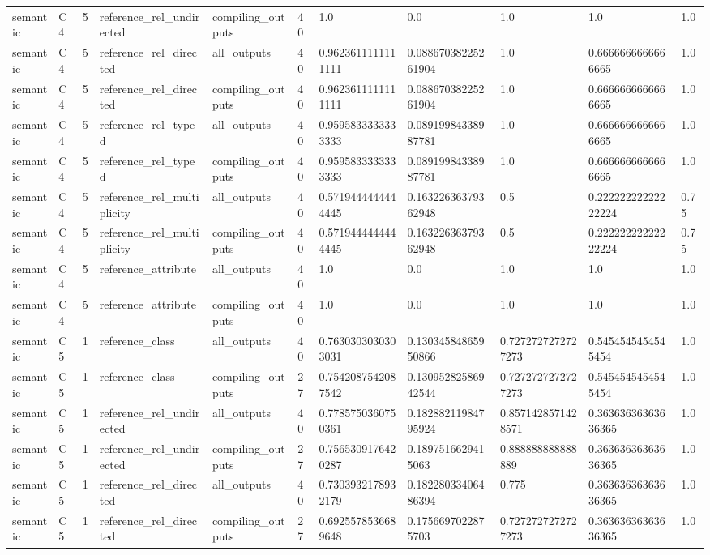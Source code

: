 \begin{tabular}{lllllllllll}
semantic & C4 & 5 & reference\_rel\_undirected & compiling\_outputs & 40 & 1.0 & 0.0 & 1.0 & 1.0 & 1.0 \\
semantic & C4 & 5 & reference\_rel\_directed & all\_outputs & 40 & 0.9623611111111111 & 0.08867038225261904 & 1.0 & 0.6666666666666665 & 1.0 \\
semantic & C4 & 5 & reference\_rel\_directed & compiling\_outputs & 40 & 0.9623611111111111 & 0.08867038225261904 & 1.0 & 0.6666666666666665 & 1.0 \\
semantic & C4 & 5 & reference\_rel\_typed & all\_outputs & 40 & 0.9595833333333333 & 0.08919984338987781 & 1.0 & 0.6666666666666665 & 1.0 \\
semantic & C4 & 5 & reference\_rel\_typed & compiling\_outputs & 40 & 0.9595833333333333 & 0.08919984338987781 & 1.0 & 0.6666666666666665 & 1.0 \\
semantic & C4 & 5 & reference\_rel\_multiplicity & all\_outputs & 40 & 0.5719444444444445 & 0.16322636379362948 & 0.5 & 0.22222222222222224 & 0.75 \\
semantic & C4 & 5 & reference\_rel\_multiplicity & compiling\_outputs & 40 & 0.5719444444444445 & 0.16322636379362948 & 0.5 & 0.22222222222222224 & 0.75 \\
semantic & C4 & 5 & reference\_attribute & all\_outputs & 40 & 1.0 & 0.0 & 1.0 & 1.0 & 1.0 \\
semantic & C4 & 5 & reference\_attribute & compiling\_outputs & 40 & 1.0 & 0.0 & 1.0 & 1.0 & 1.0 \\
semantic & C5 & 1 & reference\_class & all\_outputs & 40 & 0.7630303030303031 & 0.13034584865950866 & 0.7272727272727273 & 0.5454545454545454 & 1.0 \\
semantic & C5 & 1 & reference\_class & compiling\_outputs & 27 & 0.7542087542087542 & 0.13095282586942544 & 0.7272727272727273 & 0.5454545454545454 & 1.0 \\
semantic & C5 & 1 & reference\_rel\_undirected & all\_outputs & 40 & 0.7785750360750361 & 0.18288211984795924 & 0.8571428571428571 & 0.36363636363636365 & 1.0 \\
semantic & C5 & 1 & reference\_rel\_undirected & compiling\_outputs & 27 & 0.7565309176420287 & 0.1897516629415063 & 0.888888888888889 & 0.36363636363636365 & 1.0 \\
semantic & C5 & 1 & reference\_rel\_directed & all\_outputs & 40 & 0.7303932178932179 & 0.18228033406486394 & 0.775 & 0.36363636363636365 & 1.0 \\
semantic & C5 & 1 & reference\_rel\_directed & compiling\_outputs & 27 & 0.6925578536689648 & 0.1756697022875703 & 0.7272727272727273 & 0.36363636363636365 & 1.0 \\

\end{tabular}
